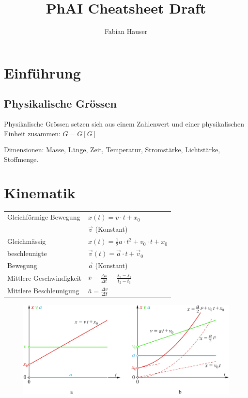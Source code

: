 \documentclass[a4paper]{scrartcl}
\title{PhAI Cheatsheet Draft}
\author{Fabian Hauser}
\begin{document}
\maketitle


\section{Einführung}

\subsection{Physikalische Grössen}

Physikalische Grössen setzen sich aus einem Zahlenwert und einer physikalischen Einheit
zusammen: $G = {G}[G]$

Dimensionen: Masse, Länge, Zeit, Temperatur, Stromstärke, Lichtstärke,
Stoffmenge.

\section{Kinematik}
	\begin{tabu} {l X}
		\hline
		Gleichförmige Bewegung
		&	$x(t) = v \cdot t + x_0$
		\\
		&	$\vec{v}$ (Konstant)
		\\ \hline
		Gleichmässig
		&	$x(t) = \frac{1}{2} a \cdot t^2 + v_0 \cdot t + x_0$
		\\
		beschleunigte
		&	$\vec{v}(t) = \vec{a} \cdot t + \vec{v}_0$
		\\
		Bewegung
		&	$\vec{a}$ (Konstant)
		\\ \hline
		Mittlere Geschwindigkeit
		&	$\bar{v} = \frac{\Delta s}{\Delta t} = \frac{s_2 - s_1}{t_2 - t_1}$
		\\ \hline
		Mittlere Beschleunigung
		&	$\bar{a} = \frac{\Delta v}{\Delta t}$ 
		\\ \hline
	\end{tabu}
	
	\begin{figure}[h!]
		\includegraphics[width=0.7\linewidth]{img/kinematik1}
		\caption{}
		\label{fig:kinematik1}
	\end{figure}
\end{document}
